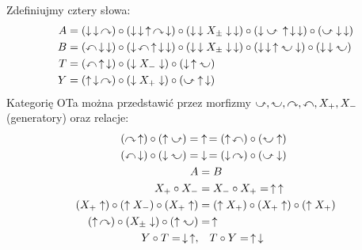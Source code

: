 \begin{proposition}
    Zdefiniujmy cztery słowa:
    \begin{align}
        A & = (\downarrow \, \downarrow \, \curvearrowright) \circ (\downarrow \, \downarrow \, \uparrow \, \curvearrowright \, \downarrow) \circ (\downarrow \, \downarrow X_\pm \downarrow \, \downarrow) \circ (\downarrow \inversedcurvearrowright \, \uparrow \, \downarrow \, \downarrow) \circ (\inversedcurvearrowright \downarrow \, \downarrow) \\
        B & = (\curvearrowleft \, \downarrow \, \downarrow) \circ (\downarrow \, \curvearrowleft \, \uparrow \, \downarrow \, \downarrow) \circ (\downarrow \, \downarrow X_\pm \downarrow \, \downarrow) \circ (\downarrow \, \downarrow \, \uparrow  \inversedcurvearrowleft \downarrow) \circ (\downarrow \, \downarrow \inversedcurvearrowleft) \\
        T & = (\curvearrowleft \, \uparrow \, \downarrow) \circ (\downarrow X_- \downarrow) \circ (\downarrow \, \uparrow \inversedcurvearrowleft) \\
        Y & = (\uparrow \, \downarrow \, \curvearrowright) \circ (\downarrow X_+ \downarrow) \circ (\inversedcurvearrowright \uparrow \, \downarrow)
    \end{align}
    Kategorię OTa można przedstawić przez morfizmy $\inversedcurvearrowright, \inversedcurvearrowleft, \curvearrowright, \curvearrowleft, X_+, X_-$ (generatory) oraz relacje:
    \begin{align}
        (\curvearrowright \, \uparrow) \circ (\uparrow \inversedcurvearrowright) = & \uparrow \, = (\uparrow \, \curvearrowleft) \circ (\inversedcurvearrowleft \uparrow) \\
        (\curvearrowleft \, \downarrow) \circ (\downarrow \inversedcurvearrowleft) = & \downarrow \, = (\downarrow \, \curvearrowright) \circ (\inversedcurvearrowright \downarrow) \\
        A & = B \\
        X_+ \circ X_- & = X_- \circ X_+ = \, \uparrow \, \uparrow \\
        (X_+ \uparrow) \circ (\uparrow X_-) \circ (X_+ \uparrow) & = (\uparrow X_+) \circ (X_+ \uparrow) \circ (\uparrow X_+) \\
        (\uparrow \, \curvearrowright) \circ (X_\pm \downarrow) \circ (\uparrow \inversedcurvearrowleft) & = \, \uparrow \\
        Y \circ T = \, \downarrow \, \uparrow, & \quad T \circ Y = \, \uparrow \, \downarrow
    \end{align}
\end{proposition}

